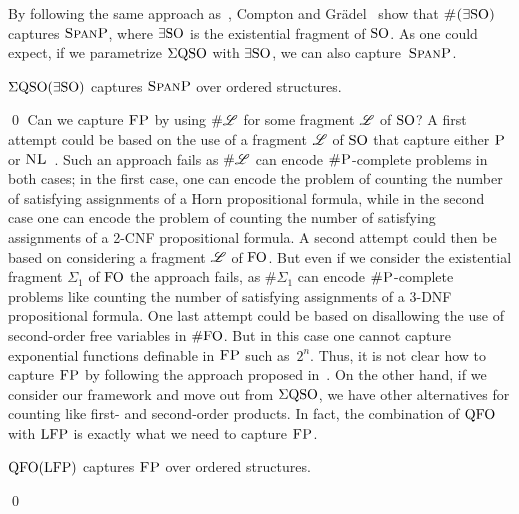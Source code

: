 By following the same approach as~\cite{SalujaST95}, Compton and Gr\"adel~\cite{ComptonG96} show that $\text{\sc \#($\exists{\rm SO}$)}$ captures $\text{\sc SpanP}$, where $\exists{\rm SO}$ is the existential fragment of ${\rm SO}$. As one could expect, if we parametrize $\Sigma{\rm QSO}$ with $\exists{\rm SO}$, we can also capture~$\text{\sc SpanP}$.
\begin{prop} \label{prop:capture-spanP}
	$\Sigma{\rm QSO}(\exists{\rm SO})$ captures $\text{\sc SpanP}$ over ordered structures.
\end{prop}
\proof

\qed
Can we capture $\text{\sc FP}$ by using $\# \mathscr{L}$ for some fragment $\mathscr{L}$ of ${\rm SO}$? A first attempt could be based on the use of a fragment $\mathscr{L}$ of ${\rm SO}$ that capture either $\text{\sc P}$ or $\text{\sc NL}$~\cite{G92}. Such an approach fails as $\# \mathscr{L}$ can encode $\text{\sc \#P}$-complete problems in both cases; in the first case, one can encode the problem of counting the number of satisfying assignments of a Horn  propositional formula, while in the second case one can encode the problem of counting the number of satisfying assignments of a 2-CNF propositional formula. A second attempt could then be based on considering a fragment $\mathscr{L}$ of ${\rm FO}$. 
But even if we consider the existential fragment $\Sigma_1$ of ${\rm FO}$ the approach fails, as $\# \Sigma_1$ can encode $\text{\sc \#P}$-complete problems like counting the number of satisfying assignments of a 3-DNF propositional formula\cite{SalujaST95}. One last attempt could be based on disallowing the use of second-order free variables in $\#{\rm FO}$. But in this case one 
cannot capture exponential functions definable in $\text{\sc FP}$ such as~$2^n$.
Thus, it is not clear how to capture $\text{\sc FP}$ 
by following the approach proposed in~\cite{SalujaST95}. 
On the other hand, if we consider our framework and move out from $\Sigma{\rm QSO}$, we have other alternatives for counting like first- and second-order products. In fact, the combination of ${\rm QFO}$ with ${\rm LFP}$ is exactly what we need to capture $\text{\sc FP}$.
\begin{thm} \label{theo:capture-fp}
	${\rm QFO}({\rm LFP})$ captures $\text{\sc FP}$ over ordered structures.
\end{thm}
\proof

\qed

